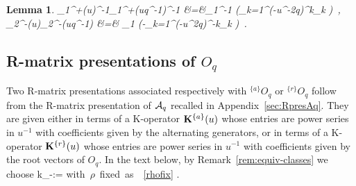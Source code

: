 \documentclass[11pt]{amsart}
\numberwithin{equation}{section}
\newtheorem{lem}[thm]{Lemma}
\numberwithin{equation}{section}
\begin{document}
\begin{lem}\label{lem:k1k2psiphi}
	\beqa
		\tk_1^+(u)^{-1}\tk_1^+(uq^{-1})^{-1} &=&\tk_1^{-1} \exp\left(\lambda\sum_{k=1}^\infty (-u^{-2}q)^k\te_{k\delta} \right)\ ,\label{eq:fullime}\\	
		\tk_2^-(u)\tk_2^-(uq^{-1}) &=& \tk_1 \exp\left(-\lambda\sum_{k=1}^\infty (-u^{2}q)^{-k}\tf_{k\delta}  \right)\ .\label{eq:fullimf}
	\eeqa
\end{lem}

\subsection{R-matrix presentations of $O_q$}\label{sec:RmatOq} Two R-matrix presentations associated respectively with $^{\{a\}}O_q$ or $^{\{r\}}O_q$ follow from the R-matrix presentation of ${\cal A}_q$ recalled in Appendix~\ref{sec:RpresAq}. They are given either in terms of a K-operator ${\bold K}^{\{a\}}(u)$ whose entries are power series in $u^{-1}$ with coefficients given by the alternating generators, or in terms of a K-operator ${\bold K}^{\{r\}}(u)$  whose entries are power series  in $u^{-1}$ with coefficients given by the root vectors of $O_q$. In the text below, by  Remark~\ref{rem:equiv-classes} we choose 
\beqa
k_-:= \quad \mbox{with $\rho$ fixed as \ \eqref{rhofix}}  .\nonumber
\eeqa
\end{document}
